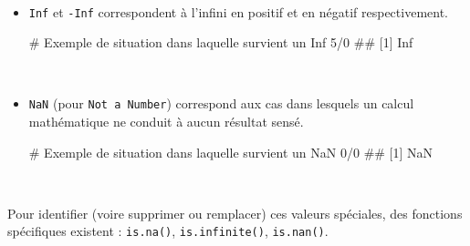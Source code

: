 \documentclass[12pt,twosided, notitlepage]{book}
\newenvironment{Shaded}{}{}
\newcommand{\DecValTok}[1]{{#1}}
\newcommand{\CommentTok}[1]{\textcolor[rgb]{0.00,0.50,0.00}{{#1}}}
\newcommand{\NormalTok}[1]{{#1}}
\renewenvironment{Shaded}{\begin{snugshade}}{\end{snugshade}}
\begin{document}
~

\begin{itemize}
\item
  \texttt{Inf} et \texttt{-Inf} correspondent à l'infini en positif et
  en négatif respectivement.

\begin{Shaded}
\begin{Highlighting}[]
\CommentTok{# Exemple de situation dans laquelle survient un Inf}
\DecValTok{5}\NormalTok{/}\DecValTok{0}
  \NormalTok{## [1] Inf}
\end{Highlighting}
\end{Shaded}
\end{itemize}

~

\begin{itemize}
\item
  \texttt{NaN} (pour \texttt{Not\ a\ Number}) correspond aux cas dans
  lesquels un calcul mathématique ne conduit à aucun résultat sensé.

\begin{Shaded}
\begin{Highlighting}[]
\CommentTok{# Exemple de situation dans laquelle survient un NaN}
\DecValTok{0}\NormalTok{/}\DecValTok{0}
  \NormalTok{## [1] NaN}
\end{Highlighting}
\end{Shaded}
\end{itemize}

~

Pour identifier (voire supprimer ou remplacer) ces valeurs spéciales,
des fonctions spécifiques existent :
\texttt{is.na()},
\texttt{is.infinite()},
\texttt{is.nan()}.
\end{document}
